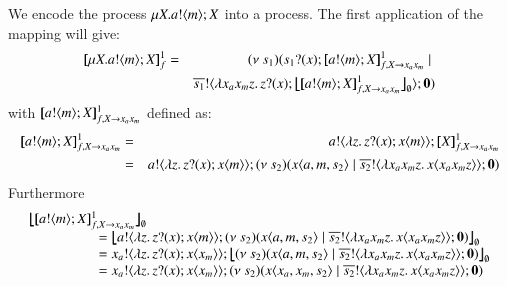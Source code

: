 %

\begin{example}

We encode the \HOp process $\mu X. a ! \langle m \rangle ; X$
into a \HO process. The first application of the mapping
will give:
%
\begin{eqnarray*}
	\pmapp{\recp{X}{\bout{a}{m} \varp{X}}}{1}{f} &=&
	\newsp{s_1}{ \binp{s_1}{x} \pmapp{\bout{a}{m} \varp{X}}{1}{f, \varp{X} \rightarrow x_ax_m} \Par\\
	&&\bout{\dual{s_1}}{ \abs{x_a x_m z} \binp{z}{x} \auxmap{\pmapp{\bout{a}{m} \varp{X}}{1}{f, \varp{X} \rightarrow x_ax_m}}{\es} } \inact}
\end{eqnarray*}
%
\noi with $[\!\![a ! \langle m \rangle ; X]\!\!]^{1}_{f, X \rightarrow x_ax_m}$ defined as:
%
\begin{eqnarray*}
	\pmapp{\bout{a}{m} \varp{X}}{1}{f, \varp{X} \rightarrow x_ax_m} &=&
	\bout{a}{\abs{z}{\binp{z}{x} \appl{x}{m}}} \pmapp{\varp{X}}{1}{f, \varp{X} \rightarrow x_ax_m}
	\\
	&=& \bout{a}{\abs{z}{\binp{z}{x} \appl{x}{m}}} \newsp{s_2}{\appl{x}{a,m, s_2}  \Par \bout{\dual{s_2}}{\abs{x_a x_m z}{\appl{x}{x_a x_m z}}} \inact}
\end{eqnarray*}
%
\noi Furthermore
%
\[
\begin{array}{l}
	\auxmap{\pmapp{\bout{a}{m} \varp{X}}{1}{f, \varp{X} \rightarrow x_ax_m}}{\es}\\
	\qquad \qquad \quad = \auxmap{\bout{a}{\abs{z}{\binp{z}{x} \appl{x}{m}}} \newsp{s_2}{\appl{x}{a,m, s_2}  \Par \bout{\dual{s_2}}{\abs{x_a x_m z}{\appl{x}{x_a x_m z}}} \inact}}{\es}
	\\
	\qquad \qquad \quad = \bout{x_a}{\abs{z}{\binp{z}{x} \appl{x}{x_m}}} \auxmap{\newsp{s_2}{\appl{x}{a,m, s_2}  \Par \bout{\dual{s_2}}{\abs{x_a x_m z}{\appl{x}{x_a x_m z}}} \inact}}{\es}
	\\
	\qquad \qquad \quad = \bout{x_a}{\abs{z}{\binp{z}{x} \appl{x}{x_m}}} \newsp{s_2}{\appl{x}{x_a,x_m, s_2}  \Par \bout{\dual{s_2}}{\abs{x_a x_m z}{\appl{x}{x_a x_m z}}} \inact}

\end{array}\]
\end{example}
